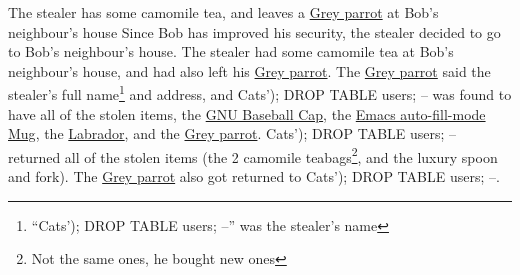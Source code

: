 \documentclass[openany]{book}
\newcommand{\GNUBaseballCap}{\href{https://shop.fsf.org/caps/gnu-baseball-cap}{GNU Baseball Cap}}
\newcommand{\EmacsMug}{\href{https://shop.fsf.org/gear/emacs-auto-fill-mode-mug}{Emacs auto-fill-mode Mug}}
\newcommand{\Labrador}{\href{https://en.wikipedia.org/wiki/Labrador\_Retriever}{Labrador}}
\newcommand{\GreyParrot}{\href{https://en.wikipedia.org/wiki/Grey\_parrot}{Grey parrot}}
\newcommand{\CatsName}{Cats'); DROP TABLE users; --}
\begin{document}
\begin{chapter}{The stealer has some camomile tea, and leaves a \GreyParrot{} at Bob's neighbour's house}
  Since Bob has improved his security, the stealer decided to go to Bob's neighbour's house.
  The stealer had some camomile tea at Bob's neighbour's house, and had also left his \GreyParrot.
  The \GreyParrot{} said the stealer's full name\footnote{``Cats'); DROP TABLE users; --'' was the stealer's name} and address,
  and \CatsName{} was found to have all of the stolen items,
  the \GNUBaseballCap, the \EmacsMug, the \Labrador, and the \GreyParrot.
  Cats'); DROP TABLE users; -- returned all of the stolen items (the 2 camomile teabags\footnote{Not the same ones, he bought new ones},
  and the luxury spoon and fork).
  The \GreyParrot{} also got returned to Cats'); DROP TABLE users; --.
\end{chapter}
\end{document}
